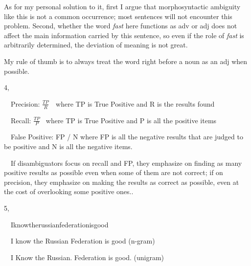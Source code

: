 \documentclass[a4paper]{article}
\begin{document}
As for my personal solution to it, first I argue that morphosyntactic ambiguity like this is not a common occurrence;
most sentences will not encounter this problem. Second, whether the word \textit{fast} here functions as adv or adj
does not affect the main information carried by this sentence, so even if the role of \textit{fast} is arbitrarily
determined, the deviation of meaning is not great.

My rule of thumb is to always treat the word right before a noun as an adj when possible.


\bigskip

4,

\ \ Precision:  $\frac{\mathit{TP}} R$\ \  where TP is True Positive and R is the results found

\ \ Recall:  $\frac{\mathit{TP}} P$ \ where TP is True Positive and P is all the positive items

\ \ False Positive: FP / N where FP is all the negative results that are judged to be positive and N is all the negative
items.


\bigskip

\ \ If disambiguators focus on recall and FP, they emphasize on finding as many positive results as possible even when
some of them are not correct; if on precision, they emphasize on making the results as correct as possible, even at the
cost of overlooking some positive ones..


\bigskip

5,

\ \ Iknowtherussianfederationisgood

\ \ I know the Russian Federation is good (n-gram)

\ \ I Know the Russian. Federation is good. (unigram)
\end{document}
